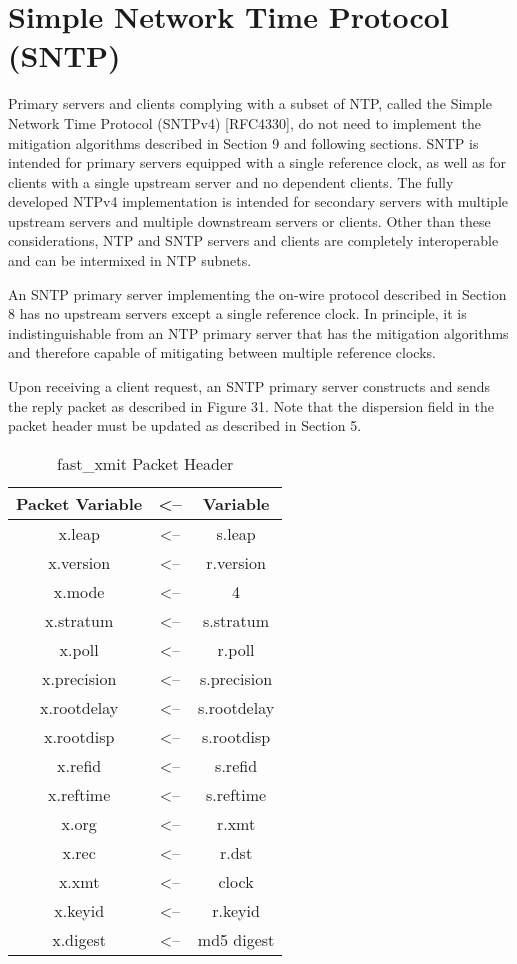 \chapter{Simple Network Time Protocol (SNTP)}

Primary servers and clients complying with a subset of NTP, called
the Simple Network Time Protocol (SNTPv4) [RFC4330], do not need to
implement the mitigation algorithms described in Section 9 and
following sections.  SNTP is intended for primary servers equipped
with a single reference clock, as well as for clients with a single
upstream server and no dependent clients.  The fully developed NTPv4
implementation is intended for secondary servers with multiple
upstream servers and multiple downstream servers or clients.  Other
than these considerations, NTP and SNTP servers and clients are
completely interoperable and can be intermixed in NTP subnets.

An SNTP primary server implementing the on-wire protocol described in
Section 8 has no upstream servers except a single reference clock.
In principle, it is indistinguishable from an NTP primary server that
has the mitigation algorithms and therefore capable of mitigating
between multiple reference clocks.

Upon receiving a client request, an SNTP primary server constructs
and sends the reply packet as described in Figure 31.  Note that the
dispersion field in the packet header must be updated as described in
Section 5.

\begin{table}[htb]
\center
\begin{tabular}{c | c | c}
Packet Variable & <-- & Variable \\
\hline
\hline
x.leap      & <-- & s.leap      \\
x.version   & <-- & r.version   \\
x.mode      & <-- & 4           \\
x.stratum   & <-- & s.stratum   \\
x.poll      & <-- & r.poll      \\
x.precision & <-- & s.precision \\
x.rootdelay & <-- & s.rootdelay \\
x.rootdisp  & <-- & s.rootdisp  \\
x.refid     & <-- & s.refid     \\
x.reftime   & <-- & s.reftime   \\
x.org       & <-- & r.xmt       \\
x.rec       & <-- & r.dst       \\
x.xmt       & <-- & clock       \\
x.keyid     & <-- & r.keyid     \\
x.digest    & <-- & md5 digest  \\
\hline
\end{tabular}
\label{fast_xmit_packet_header}
\caption{fast\_xmit Packet Header}
\end{table}

